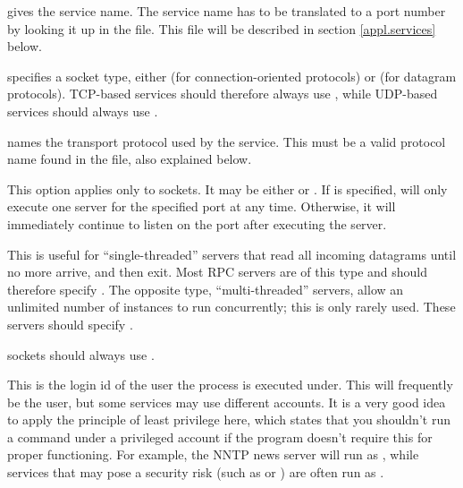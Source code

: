\documentclass[11pt,makeidx]{report}
\begin{document}
{\newpage
\clearpage
\samepage \begin{dispitems}%
        gives the service name. The service name has to be translated to
        a port number by looking it up in the  file.
        This file will be described in section \ref{appl.services}
        below.

        specifies a socket type, either  (for
        connection-oriented protocols) or  (for datagram
        protocols).  TCP-based services should therefore always use
        , while UDP-based services should always use
        .

        names the transport protocol used by the service. This must be a
        valid protocol name found in the  file, also
        explained below.

        This option applies only to  sockets. It may
        be either  or . If  is
        specified,  will only execute one server for
        the specified port at any time. Otherwise, it will immediately
        continue to listen on the port after executing the server.

        This is useful for ``single-threaded'' servers that read all
        incoming datagrams until no more arrive, and then exit. Most RPC
        servers are of this type and should therefore specify
        .  The opposite type, ``multi-threaded'' servers,
        allow an unlimited number of instances to run concurrently; this
        is only rarely used. These servers should specify
        .

         sockets should always use .

        This is the login id of the user the process is executed under.
        This will frequently be the  user, but some services
        may use different accounts. It is a very good idea to apply the
        principle of least privilege here, which states that you shouldn't
        run a command under a privileged account if the program doesn't
        require this for proper functioning.
        For example, the NNTP news server will run as , while
        services that may pose a security risk (such as  or
        ) are often run as .


\end{dispitems}}
\end{document}

